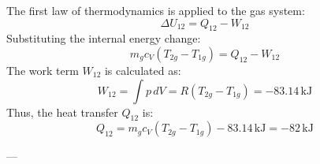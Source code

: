 The first law of thermodynamics is applied to the gas system:  
\[
\Delta U_{12} = Q_{12} - W_{12}
\]  
Substituting the internal energy change:  
\[
m_g c_V (T_{2g} - T_{1g}) = Q_{12} - W_{12}
\]  
The work term \( W_{12} \) is calculated as:  
\[
W_{12} = \int p \, dV = R(T_{2g} - T_{1g}) = -83.14 \, \text{kJ}
\]  
Thus, the heat transfer \( Q_{12} \) is:  
\[
Q_{12} = m_g c_V (T_{2g} - T_{1g}) - 83.14 \, \text{kJ} = -82 \, \text{kJ}
\]  

---